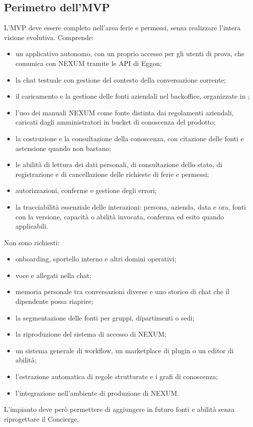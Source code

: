 \documentclass[documento]{gpt}
\begin{document}
\subsection{Perimetro dell'MVP}
L'MVP deve essere completo nell'area ferie e permessi, senza realizzare l'intera
visione evolutiva. Comprende:
\begin{itemize}
  \item un applicativo autonomo, con un proprio accesso per gli utenti di prova,
        che comunica con NEXUM tramite le API di Eggon;
  \item la chat testuale con gestione del contesto della conversazione
        corrente;
  \item il caricamento e la gestione delle fonti aziendali nel backoffice,
        organizzate in ;
  \item l'uso dei manuali NEXUM come fonte distinta dai regolamenti aziendali,
        caricati dagli amministratori in bucket di conoscenza del prodotto;
  \item la costruzione e la consultazione della conoscenza, con citazione delle
        fonti e astensione quando non bastano;
  \item le abilità di lettura dei dati personali, di consultazione dello stato,
        di registrazione e di cancellazione delle richieste di ferie e permessi;
  \item autorizzazioni, conferme e gestione degli errori;
  \item la tracciabilità essenziale delle interazioni: persona, azienda, data e
        ora, fonti con la versione, capacità o abilità invocata, conferma ed
        esito quando applicabili.
\end{itemize}
Non sono richiesti:
\begin{itemize}
  \item onboarding, sportello interno e altri domini operativi;
  \item voce e allegati nella chat;
  \item memoria personale tra conversazioni diverse e uno storico di chat che
        il dipendente possa riaprire;
  \item la segmentazione delle fonti per gruppi, dipartimenti o sedi;
  \item la riproduzione del sistema di accesso di NEXUM;
  \item un sistema generale di workflow, un marketplace di plugin o un editor di
        abilità;
  \item l'estrazione automatica di regole strutturate e i grafi di conoscenza;
  \item l'integrazione nell'ambiente di produzione di NEXUM.
\end{itemize}
L'impianto deve però
permettere di aggiungere in futuro fonti e abilità senza riprogettare il
Concierge.
\end{document}
